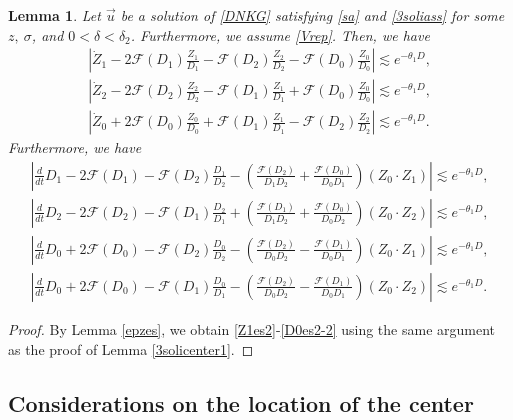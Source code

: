 \documentclass[reqno]{amsart}
\theoremstyle{plain}
\newtheorem{lemma}[theorem]{Lemma}
\theoremstyle{definition}
\numberwithin{equation}{section}
\newcommand{\1}{\mathbbm{1}}
\begin{document}
\begin{lemma}\label{repcondes}
Let $\vec{u}$ be a solution of \eqref{DNKG} satisfying \eqref{sa} and \eqref{3soliass} for some $z,\ \sigma$, and $0<\delta<\delta_2$. Furthermore, we assume \eqref{Vrep}. Then, we have
\begin{align}
\left|\dot{Z}_1-2\mathcal{F}(D_1)\frac{Z_1}{D_1}-\mathcal{F}(D_2)\frac{Z_2}{D_2}-\mathcal{F}(D_0)\frac{Z_0}{D_0}\right|\lesssim e^{-\theta_1 D},\label{Z1es2}
\\
\left|\dot{Z}_2-2\mathcal{F}(D_2)\frac{Z_2}{D_2}-\mathcal{F}(D_1)\frac{Z_1}{D_1}+\mathcal{F}(D_0)\frac{Z_0}{D_0}\right|\lesssim e^{-\theta_1 D},\label{Z2es2}
\\
\left|\dot{Z}_0+2\mathcal{F}(D_0)\frac{Z_0}{D_0}+\mathcal{F}(D_1)\frac{Z_1}{D_1}-\mathcal{F}(D_2)\frac{Z_2}{D_2}\right|\lesssim e^{-\theta_1 D}.\label{Z0es2}
\end{align}
Furthermore, we have
\begin{align}
\left|\frac{d}{dt}D_1-2\mathcal{F}(D_1)-\mathcal{F}(D_2)\frac{D_1}{D_2}-\left(\frac{\mathcal{F}(D_2)}{D_1D_2}+\frac{\mathcal{F}(D_0)}{D_0D_1}\right)(Z_0\cdot Z_1)\right|\lesssim e^{-\theta_1 D},\label{D1es2}
\\
\left|\frac{d}{dt}D_2-2\mathcal{F}(D_2)-\mathcal{F}(D_1)\frac{D_2}{D_1}+\left(\frac{\mathcal{F}(D_1)}{D_1D_2}+\frac{\mathcal{F}(D_0)}{D_0D_2}\right)(Z_0\cdot Z_2)\right|\lesssim e^{-\theta_1 D}, \label{D2es2}
\\
\left|\frac{d}{dt}D_0+2\mathcal{F}(D_0)-\mathcal{F}(D_2)\frac{D_0}{D_2}-\left(\frac{\mathcal{F}(D_2)}{D_0D_2}-\frac{\mathcal{F}(D_1)}{D_0D_1}\right)(Z_0\cdot Z_1)\right|\lesssim e^{-\theta_1 D}, \label{D0es2-1}
\\
\left|\frac{d}{dt}D_0+2\mathcal{F}(D_0)-\mathcal{F}(D_1)\frac{D_0}{D_1}-\left(\frac{\mathcal{F}(D_2)}{D_0D_2}-\frac{\mathcal{F}(D_1)}{D_0D_1}\right)(Z_0\cdot Z_2)\right|\lesssim e^{-\theta_1 D}. \label{D0es2-2}
\end{align}
\end{lemma}
\begin{proof}
By Lemma \ref{epzes}, we obtain \eqref{Z1es2}-\eqref{D0es2-2} using the same argument as the proof of Lemma \ref{3solicenter1}.


\end{proof}






\subsection{Considerations on the location of the center}
\end{document}
